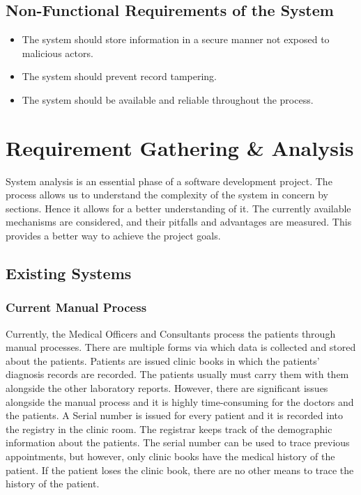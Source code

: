 \documentclass[12pt,a4paper]{report}
\begin{document}
\section{Non-Functional Requirements of the System}
\begin{itemize}

\item The system should store information in a secure manner not exposed to malicious actors.
\item The system should prevent record tampering. 
\item The system should be available and reliable throughout the process. 
	
\end{itemize}

\newpage
\chapter{Requirement Gathering \& Analysis}

System analysis is an essential phase of a software development project. The process allows us to understand the complexity of the system in concern by sections. Hence it allows for a better understanding of it.  The currently available mechanisms are considered, and their pitfalls and advantages are measured. This provides a better way to achieve the project goals.

\section{Existing Systems}
\subsection{Current Manual Process}

Currently, the Medical Officers and Consultants process the patients through manual processes. There are multiple forms via which data is collected and stored about the patients. 
Patients are issued clinic books in which the patients’ diagnosis records are recorded. The patients usually must carry them with them alongside the other laboratory reports. However, there are significant issues alongside the manual process and it is highly time-consuming for the doctors and the patients. A Serial number is issued for every patient and it is recorded into the registry in the clinic room. The registrar keeps track of the demographic information about the patients. The serial number can be used to trace previous appointments, but however, only clinic books have the medical history of the patient. If the patient loses the clinic book, there are no other means to trace the history of the patient. 
\end{document}
